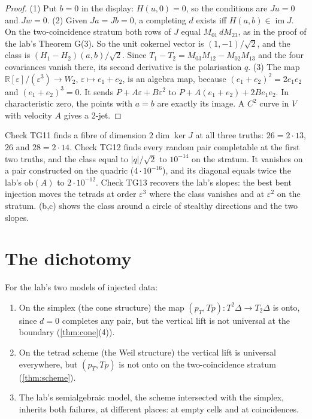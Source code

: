 \documentclass[11pt]{article}
\theoremstyle{definition}\newtheorem{definition}[theorem]{Definition}\newtheorem{remark}[theorem]{Remark}\newtheorem{example}[theorem]{Example}
\newcommand{\R}{\mathbb R}\newcommand{\X}{\mathbb X}\newcommand{\C}{\mathcal C}
\begin{document}
\begin{proof}
(1) Put $b=0$ in the display: $H(u,0)=0$, so the conditions are $Ju=0$ and $Jw=0$. (2) Given $Ja=Jb=0$, a completing $d$ exists iff
$H(a,b)\in\operatorname{im}J$. On the two-coincidence stratum both rows of $J$ equal $M_{01}\,dM_{23}$, as in the proof of the lab's Theorem
G(3). So the unit cokernel vector is $(1,-1)/\sqrt2$, and the class is $(H_1-H_2)(a,b)/\sqrt2$. Since $T_1-T_2=M_{03}M_{12}-M_{02}M_{13}$
and the four covariances vanish there, its second derivative is the polarisation $q$. (3) The map $\R[\varepsilon]/(\varepsilon^3)\to W_2$,
$\varepsilon\mapsto e_1+e_2$, is an algebra map, because $(e_1+e_2)^2=2e_1e_2$ and $(e_1+e_2)^3=0$. It sends $P+A\varepsilon+B\varepsilon^2$ to
$P+A(e_1+e_2)+2Be_1e_2$. In characteristic zero, the points with $a=b$ are exactly its image. A $C^2$ curve in $V$ with velocity $A$ gives a
2-jet.
\end{proof}

Check TG11 finds a fibre of dimension $2\dim\ker J$ at all three truths: $26=2\cdot13$, $26$ and $28=2\cdot14$. Check TG12 finds every
random pair completable at the first two truths, and the class equal to $|q|/\sqrt2$ to $10^{-14}$ on the stratum. It vanishes on a
pair constructed on the quadric ($4\cdot10^{-16}$), and its diagonal equals twice the lab's $\mathrm{ob}(A)$ to $2\cdot10^{-12}$.
Check TG13 recovers the lab's slopes: the best bent injection moves the tetrads at order $\varepsilon^3$ where the class vanishes and at
$\varepsilon^2$ on the stratum. (b,c) shows the class around a circle of stealthy directions and the two slopes.

\section{The dichotomy}\label{sec:dichotomy}
\begin{corollary}\label{cor:dichotomy}
For the lab's two models of injected data:
\begin{enumerate}
\item[(1)] On the simplex (the cone structure) the map $(p_T,Tp):T^2\Delta\to T_2\Delta$ is onto, since $d=0$ completes any pair, but the
  vertical lift is not universal at the boundary (\cref{thm:cone}(4)).
\item[(2)] On the tetrad scheme (the Weil structure) the vertical lift is universal everywhere, but $(p_T,Tp)$ is not onto on the
  two-coincidence stratum (\cref{thm:scheme}).
\item[(3)] The lab's semialgebraic model, the scheme intersected with the simplex, inherits both failures, at different places: at
  empty cells and at coincidences.
\end{enumerate}
\end{corollary}
\end{document}
